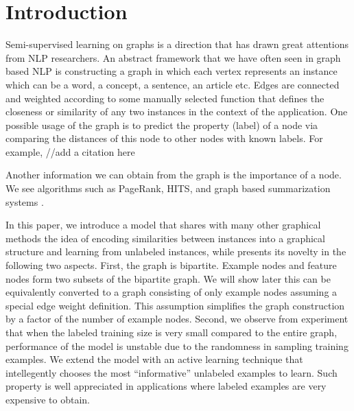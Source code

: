 \section{Introduction}

Semi-supervised learning on graphs is a direction that has drawn great
attentions from NLP researchers. %
An abstract framework that we have often seen in graph based NLP is constructing
a graph in which each vertex represents an instance which can
be a word, a concept, a sentence, an article etc. Edges
are connected and weighted according to some manually selected
function that defines the closeness or similarity of any two instances in the
context of the application. 
One possible usage of the graph is to predict the
property (label) of a node via comparing the distances of this node to other
nodes with known labels. For example, //add a citation here

Another information we can obtain from the graph is the importance of a node.
We see algorithms such as PageRank\cite{}, HITS\cite{}, and graph based
summarization systems\cite{} .




In this paper, we introduce a model that shares with many other graphical
methods the idea of encoding similarities between instances into a graphical
structure and learning from unlabeled instances, while presents its novelty in
the following two aspects. First, the graph is bipartite. Example nodes and
feature nodes form two subsets of the bipartite graph. We will show later this
can be equivalently converted to a graph consisting of only example nodes
assuming a special edge weight definition. This
assumption simplifies the graph construction by a factor of the number of example nodes. 
Second, we observe from experiment that when the labeled training size is very
small compared to the entire graph, performance of the model is unstable due to the
randomness in sampling training examples. We extend the model with an active
learning technique that intellegently chooses the most ``informative'' unlabeled
examples to learn. Such property is well appreciated in applications where
labeled examples are very expensive to obtain.  

